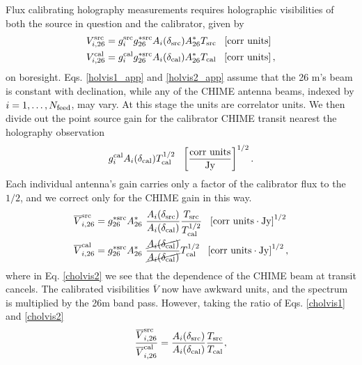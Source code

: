 Flux calibrating holography measurements requires holographic visibilities of both the source in question and the calibrator, given by\begin{subequations}
\begin{align}
V^{\rm src}_{i,{\rm 26}} &= g^{\rm src}_i g^{*{\rm src}}_{\rm 26} A_i(\delta_{\rm src}) A^*_{\rm 26} T_{\rm src} ~~ \left[ {\rm corr~units} \right] \label{holvis1_app}
\\ 
V^{\rm cal}_{i,{\rm 26}} &= g^{\rm cal}_i g^{*{\rm src}}_{\rm 26} A_i(\delta_{\rm cal}) A^*_{\rm 26} T_{\rm cal} ~~  \left[ {\rm corr~units} \right], \label{holvis2_app}
\end{align}
\end{subequations}
on boresight. Eqs. \ref{holvis1_app} and \ref{holvis2_app} assume that the 26 m's beam is constant with declination, while any of the CHIME antenna beams, indexed by $i=1,\dots,N_{\rm feed}$, may vary. At this stage the units are correlator units. We then divide out the point source gain for the calibrator CHIME transit nearest the holography observation 
\begin{align}
g^{\rm cal}_i A_i(\delta_{\rm cal}) T^{1/2}_{\rm cal} ~~  \left[ \frac{\rm corr~units}{\rm Jy} \right]^{1/2}.
\end{align}
Each individual antenna's gain carries only a factor of the calibrator flux to the $1/2$, and we correct only for the CHIME gain in this way.
\begin{subequations}
\begin{align}
\overline{V}^{\rm src}_{i,{\rm 26}} &= g^{*{\rm src}}_{\rm 26}A^*_{\rm 26}~\frac{A_i(\delta_{\rm src})}{A_i(\delta_{\rm cal})}  \frac{T_{\rm src}}{T_{\rm cal}^{1/2}} ~~ \left[ {\rm corr~units \cdot Jy} \right]^{1/2} \label{cholvis1}
\\ 
\overline{V}^{\rm cal}_{i,{\rm 26}} &=  g^{*{\rm src}}_{\rm 26} A^*_{\rm 26}~\frac{\cancel{A_i(\delta_{\rm cal})}}{\cancel{A_i(\delta_{\rm cal})}} T_{\rm cal}^{1/2} ~~  \left[ {\rm corr~units \cdot Jy} \right]^{1/2},  \label{cholvis2}
\end{align}
\end{subequations}
where in Eq. \ref{cholvis2} we see that the dependence of the CHIME beam at transit cancels. The calibrated visibilities $\overline{V}$ now have awkward units, and the spectrum is multiplied by the 26m band pass. However, taking the ratio of Eqs. \ref{cholvis1} and \ref{cholvis2}
\begin{align}
\frac{\overline{V}^{\rm src}_{i,{\rm 26}}}{\overline{V}^{\rm cal}_{i,{\rm 26}}} = \frac{A_i(\delta_{\rm src})}{A_i(\delta_{\rm cal})} \frac{T_{\rm src}}{T_{\rm cal}},
\end{align}
